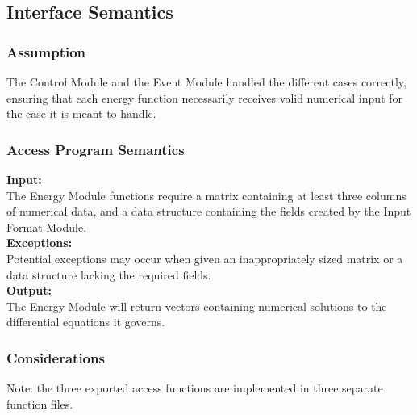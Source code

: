 \documentclass[12pt]{article}
\begin{document}
\subsection{Interface Semantics}


\subsubsection{Assumption}
The Control Module and the Event Module handled the different cases correctly,
 ensuring that each energy function necessarily receives valid numerical input 
  for the case it is meant to handle.


\subsubsection{Access Program Semantics}

\noindent \textbf{Input:}\\
The Energy Module functions require a matrix containing at least three columns of
numerical data, and a data structure containing the fields created by the 
Input Format Module. \\

\noindent \textbf{Exceptions:}\\
Potential exceptions may occur when given an inappropriately sized matrix or a 
data structure lacking the required fields.\\

\noindent \textbf{Output:}\\
The Energy Module will return vectors containing numerical solutions to
the differential equations it governs. \\


\subsubsection{Considerations}
Note: the three exported access functions are implemented in three separate function files. 

\end{document}
